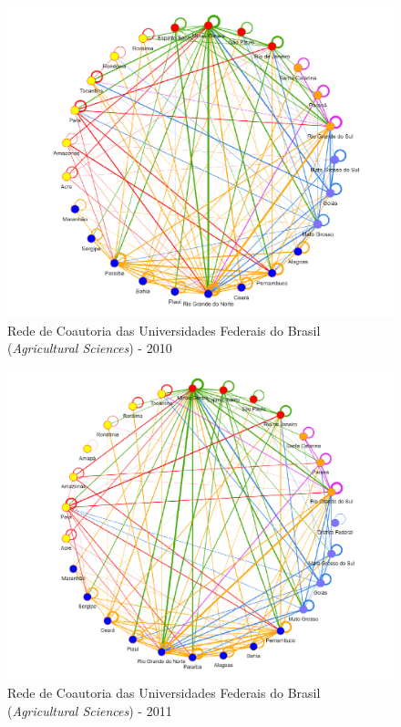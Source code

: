 \begin{figure}
	\centering
	\includegraphics[scale=0.6]{Imagens/rede-agr-br-2010.pdf}
	\caption{Rede de Coautoria das Universidades Federais do Brasil (\textit{Agricultural Sciences}) - 2010}
	\label{Rede de Coautoria - UF AGRI BR 2010}
\end{figure}

\begin{figure}[H]
	\centering
	\includegraphics[scale=0.6]{Imagens/rede-agr-br-2011.pdf}
	\caption{Rede de Coautoria das Universidades Federais do Brasil (\textit{Agricultural Sciences}) - 2011}
	\label{Rede de Coautoria - UF AGRI BR 2011}
\end{figure}


